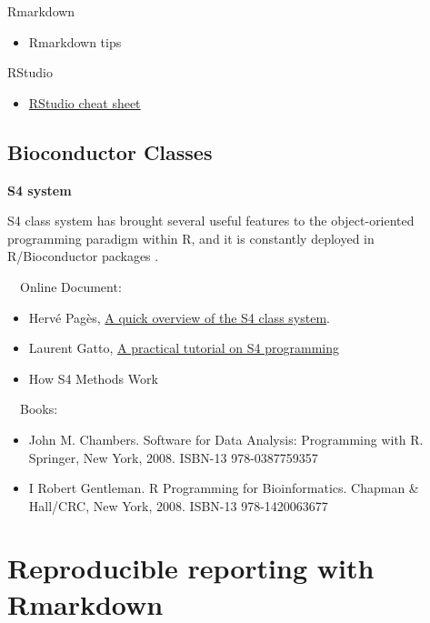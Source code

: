 \documentclass[
]{book}
\providecommand{\tightlist}{%
  \setlength{\itemsep}{0pt}\setlength{\parskip}{0pt}}
\begin{document}
Rmarkdown

\begin{itemize}
\tightlist
\item
  Rmarkdown tips \citep{Xie2020}
\end{itemize}

RStudio

\begin{itemize}
\tightlist
\item
  \href{https://www.rstudio.com/wp-content/uploads/2016/01/rstudio-IDE-cheatsheet.pdf}{RStudio cheat sheet}
\end{itemize}

\hypertarget{bioc_intro}{%
\subsection{Bioconductor Classes}\label{bioc_intro}}

\textbf{S4 system}

S4 class system has brought several useful features to the
object-oriented programming paradigm within R, and it is constantly
deployed in R/Bioconductor packages \citep{Huber2015}.

~~Online Document:

\begin{itemize}
\tightlist
\item
  Hervé Pagès, \href{https://bioconductor.org/packages/release/bioc/vignettes/S4Vectors/inst/doc/S4QuickOverview.pdf}{A quick overview of the S4 class system}.
\item
  Laurent Gatto, \href{https://bioconductor.org/help/course-materials/2013/CSAMA2013/friday/afternoon/S4-tutorial.pdf}{A practical tutorial on S4 programming}
\item
  How S4 Methods Work \citep{Chambers2006}
\end{itemize}

~~Books:

\begin{itemize}
\tightlist
\item
  John M. Chambers. Software for Data Analysis: Programming with R. Springer, New York, 2008. ISBN-13 978-0387759357 \citep{Chambers2008}
\item
  I Robert Gentleman. R Programming for Bioinformatics. Chapman \& Hall/CRC, New York, 2008. ISBN-13 978-1420063677 \citep{gentleman2008r}
\end{itemize}

\hypertarget{reproducible-reporting-with-rmarkdown}{%
\section{Reproducible reporting with Rmarkdown}\label{reproducible-reporting-with-rmarkdown}}
\end{document}

